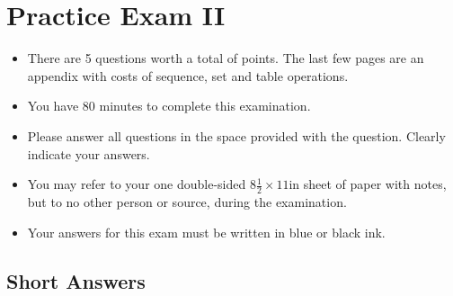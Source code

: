 \chapter{Practice Exam II}

\begin{preamble}
\newcommand{\numquestions}{5}

\begin{itemize}
\item There are \numquestions{} questions worth a total of \numpoints{} points.
  The last few pages are an appendix with costs of sequence,
  set and table operations.
\item You have 80 minutes to complete this examination.
\item Please answer all questions in the space provided with the
  question.  Clearly indicate your answers.
\item You may refer to your one double-sided $8\frac{1}{2} \times 11$in
  sheet of paper with notes, but to no other person or source, during the
  examination.

\item Your answers for this exam must be written in blue or black ink.

\end{itemize}
\end{preamble}

%


\section{Short Answers}

